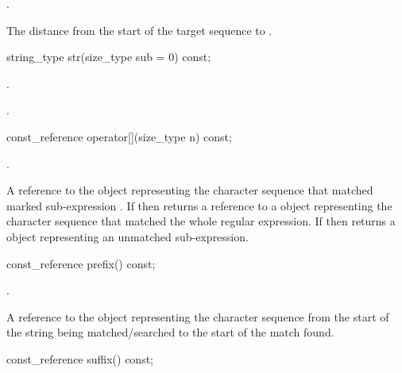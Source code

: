 \begin{itemdescr}
\pnum
\requires {}.

\pnum
\returns The distance from the start of the target sequence
to .
\end{itemdescr}

%
\begin{itemdecl}
string_type str(size_type sub = 0) const;
\end{itemdecl}

\begin{itemdescr}
\pnum
\requires {}.

\pnum
\returns {}.
\end{itemdescr}

%
\begin{itemdecl}
const_reference operator[](size_type n) const;
\end{itemdecl}

\begin{itemdescr}
\pnum
\requires {}.

\pnum
\returns A reference to the  object representing the
character sequence that matched marked sub-expression . If 
then returns a reference to a  object representing the
character sequence that matched the whole regular expression. If
 then returns a  object representing an
unmatched sub-expression.
\end{itemdescr}

%
\begin{itemdecl}
const_reference prefix() const;
\end{itemdecl}

\begin{itemdescr}
\pnum
\requires {}.

\pnum
\returns A reference to the  object representing the
character sequence from the start of the string being
matched/searched to the start of the match found.
\end{itemdescr}

%
\begin{itemdecl}
const_reference suffix() const;
\end{itemdecl}


